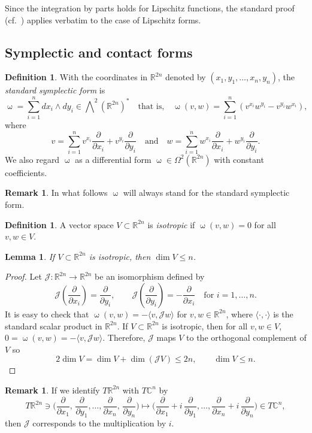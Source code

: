 \documentclass[intlimits,12pt,reqno]{amsart}
\newcommand{\cJ}{\mathcal J}
\newcommand{\bbbc}{\mathbb C}
\newcommand{\R}{\mathbb R}
\numberwithin{equation}{section}
\newtheorem{lemma}[theorem]{Lemma}
\theoremstyle{definition}
\newtheorem{remark}[theorem]{Remark}
\newtheorem{definition}[theorem]{Definition}
\newcommand{\Ep}{\bigwedge\nolimits}
\begin{document}
Since the integration by parts holds for Lipschitz functions, the standard proof (cf.\ \cite[Theorem~16.11]{Lee}) applies verbatim to the case of Lipschitz forms.

\subsection{Symplectic and contact forms}
\label{symp}

\begin{definition}
With the coordinates in $\R^{2n}$ denoted by $(x_1,y_1,\ldots,x_n,y_n)$, the {\em standard symplectic form} is
\begin{equation}
\label{eq128}
\upomega=\sum_{i=1}^n dx_i\wedge dy_i\in\Ep^2(\R^{2n})^*
\quad
\text{that is,}
\quad
\upomega(v,w)=
\sum_{i=1}^n \left( v^{x_i}w^{y_i}- v^{y_i}w^{x_i}\right),
\end{equation}
where
$$
v=\sum_{i=1}^n v^{x_i}\frac{\partial}{\partial x_i} + v^{y_i} \frac{\partial}{\partial y_i}
\quad
\mbox{and}
\quad
w=\sum_{i=1}^n w^{x_i}\frac{\partial}{\partial x_i} + w^{y_i} \frac{\partial}{\partial y_i}.
$$
We also regard $\upomega$ as a differential form
$\upomega\in \Omega^2(\R^{2n})$ with constant coefficients.
\end{definition}

\begin{remark}
In what follows $\upomega$ will always stand for the standard symplectic form.
\end{remark}

\begin{definition}
A vector space $V\subset\R^{2n}$ is {\em isotropic} if $\upomega(v,w)=0$ for all $v,w\in V$.
\end{definition}
\begin{lemma}
\label{T62}
If $V\subset\R^{2n}$ is isotropic, then $\dim V\leq n$.
\end{lemma}
\begin{proof}
Let $\cJ:\R^{2n}\to \R^{2n}$ be an isomorphism defined by
$$ 
\cJ\left(\frac{\partial}{\partial x_i} \right) = \frac{\partial}{\partial y_i}, 
\qquad 
\cJ\left(\frac{\partial}{\partial y_i} \right) = -\frac{\partial}{\partial x_i}  
\quad\text{for $i=1,\hdots,n$.}
$$
It is easy to check that
$\upomega(v,w)=-\langle v,\cJ w\rangle$
for $v,w\in\R^{2n}$,
where $\langle\cdot,\cdot\rangle$ is the standard scalar product in $\R^{2n}$.
If $V\subset\R^{2n}$ is isotropic, 
then for all $v,w\in V$, $0=\upomega(v,w)=-\langle v,\cJ w\rangle$. Therefore,
$\cJ$ maps $V$ to the orthogonal complement of $V$ so 
$$
2\dim V=\dim V+\dim (\cJ V)\leq 2n, 
\qquad
\dim V\leq n.
$$
\end{proof}
\begin{remark}
If we identify $T\R^{2n}$ with $T\bbbc^n$ by
$$
T\R^{2n}\ni\Big(\frac{\partial}{\partial x_1},\,\frac{\partial}{\partial y_1},\ldots,\frac{\partial}{\partial x_n},\,\frac{\partial}{\partial y_n}\Big)\mapsto
\Big(\frac{\partial}{\partial x_1}+i\,\frac{\partial}{\partial y_1},\ldots,\frac{\partial}{\partial x_n}+i\,\frac{\partial}{\partial y_n}\Big)\in T\bbbc^n,
$$
then $\cJ$ corresponds to the multiplication by $i$.
\end{remark}
\end{document}
